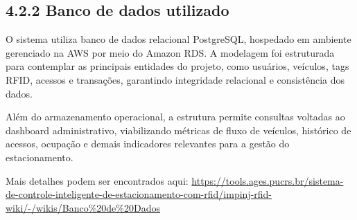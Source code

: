 \hypertarget{__RefHeading___Toc4805_3118176633}{}
\subsection*{4.2.2 Banco de dados utilizado}
\label{ages-iii:text-h-0078}

\originaltab{}O sistema utiliza banco de dados relacional PostgreSQL\space\cite{ages-iii-postgresql}, hospedado em ambiente gerenciado na AWS por meio do Amazon RDS\space\cite{ages-iii-rds}. A modelagem foi estruturada para contemplar as principais entidades do projeto, como usuários, veículos, tags RFID\space\cite{ages-iii-rfid-nist}, acessos e transações, garantindo integridade relacional e consistência dos dados.\par

Além do armazenamento operacional, a estrutura permite consultas voltadas ao dashboard administrativo, viabilizando métricas de fluxo de veículos, histórico de acessos, ocupação e demais indicadores relevantes para a gestão do estacionamento.\par

\begingroup\raggedright \indent Mais detalhes podem ser encontrados aqui: \url{https://tools.ages.pucrs.br/sistema-de-controle-inteligente-de-estacionamento-com-rfid/impinj-rfid-wiki/-/wikis/Banco%20de%20Dados}\par\endgroup
